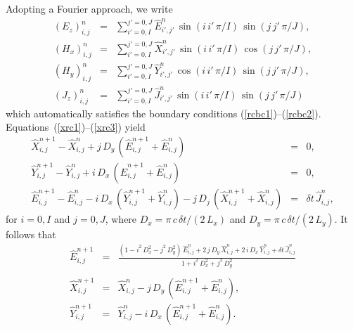 Adopting a Fourier approach, we write
\begin{eqnarray}
(E_z)_{i,j}^n &=& \sum_{i'=0,I}^{j'=0,J}\hat{E}_{i',j'}^n\,\sin(i\,i'\,\pi/I)\,\sin(j\,j'\,\pi/J),\\[0.5ex]
(H_x)_{i,j}^n &=& \sum_{i'=0,I}^{j'=0,J} \hat{X}_{i',j'}^n\,\sin(i\,i'\,\pi/I)\,\cos(j\,j'\,\pi/J),\\[0.5ex]
(H_y)_{i,j}^n &=& \sum_{i'=0,I}^{j'=0,J} \hat{Y}_{i',j'}^n\,\cos(i\,i'\,\pi/I)\,\sin(j\,j'\,\pi/J),\\[0.5ex]
(J_z)_{i,j}^n &=& \sum_{i'=0,I}^{j'=0,J} \hat{J}_{i',j'}^n\,\sin(i\,i'\,\pi/I)\,\sin(j\,j'\,\pi/J)
\end{eqnarray}
which automatically satisfies the boundary conditions (\ref{rcbc1})--(\ref{rcbc2}). 
Equations~(\ref{xrc1})--(\ref{xrc3}) yield
\begin{eqnarray}
\hat{X}_{i,j}^{n+1}-\hat{X}_{i,j}^n + j\,D_y\,(\hat{E}_{i,j}^{n+1}+\hat{E}_{i,j}^{n})&=&0,\\[0.5ex]
\hat{Y}_{i,j}^{n+1}-\hat{Y}_{i,j}^n + i\,D_x\,(\hat{E}_{i,j}^{n+1}+\hat{E}_{i,j}^{n})&=&0,\\[0.5ex]
\hat{E}_{i,j}^{n+1}-\hat{E}_{i,j}^n - i\,D_x\,(\hat{Y}_{i,j}^{n+1}+\hat{Y}_{i,j}^{n})
- j\,D_j\,(\hat{X}_{i,j}^{n+1}+\hat{X}_{i,j}^{n})&=&\delta t\,\hat{J}^{n}_{i,j},
\end{eqnarray}
for $i=0,I$ and $j=0,J$, where $D_x=\pi\,c\,\delta t/(2\,L_x)$ and  $D_y=\pi\,c\,\delta t/(2\,L_y)$.
It follows that
\begin{eqnarray}
\hat{E}^{n+1}_{i,j} &=&  \frac{(1-i^2\,D_x^2-j^2\,D_y^2)\,\hat{E}_{i,j}^n + 2\,j\,D_y\,
\hat{X}_{i,j}^n+ 2\,i\,D_x\,\hat{Y}_{i,j}^n
+\delta t \,\hat{J}^n_{i,j}}
{1 + i^2\,D_x^2+j^2\,D_y^2}\nonumber\\[0.5ex]
&&\label{xstepa}\\[0.5ex]
\hat{X}_{i,j}^{n+1}& =& \hat{X}_{i,j}^n - j\,D_y\,(\hat{E}_{i,j}^{n+1}+\hat{E}_{i,j}^{n}),\\[0.5ex]
\hat{Y}_{i,j}^{n+1}&=& \hat{Y}_{i,j}^n - i\,D_x\,(\hat{E}_{i,j}^{n+1}+\hat{E}_{i,j}^{n}).\label{xstepb}
\end{eqnarray}

